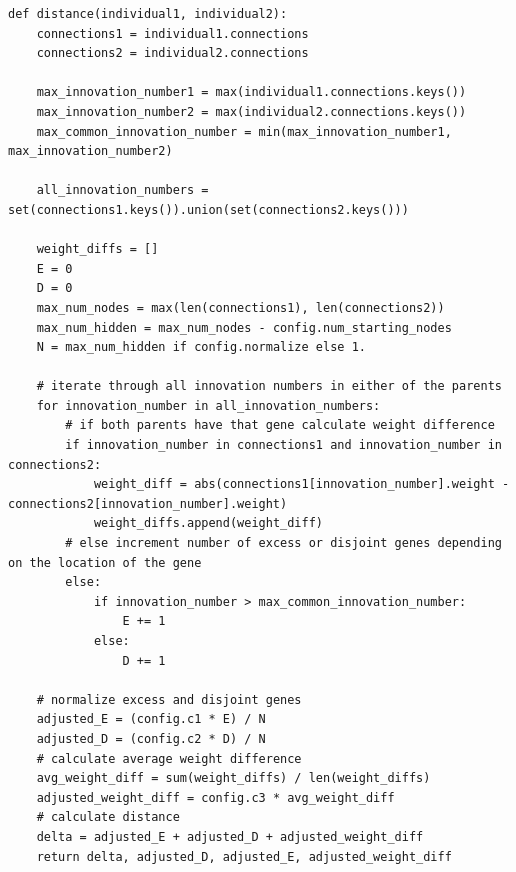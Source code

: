 \documentclass[times, utf8, diplomski, numeric]{fer}
\begin{document}
\begin{lstlisting}[frame=single, label=kod18, caption=Izvorni tekst metode \textit{distance} iz paketa \textit{utility}]
def distance(individual1, individual2):
	connections1 = individual1.connections
	connections2 = individual2.connections

	max_innovation_number1 = max(individual1.connections.keys())
	max_innovation_number2 = max(individual2.connections.keys())
	max_common_innovation_number = min(max_innovation_number1, max_innovation_number2)

	all_innovation_numbers = set(connections1.keys()).union(set(connections2.keys()))

	weight_diffs = []
	E = 0
	D = 0
	max_num_nodes = max(len(connections1), len(connections2))
	max_num_hidden = max_num_nodes - config.num_starting_nodes
	N = max_num_hidden if config.normalize else 1.

	# iterate through all innovation numbers in either of the parents
	for innovation_number in all_innovation_numbers:
		# if both parents have that gene calculate weight difference
		if innovation_number in connections1 and innovation_number in connections2:
			weight_diff = abs(connections1[innovation_number].weight - connections2[innovation_number].weight)
			weight_diffs.append(weight_diff)
		# else increment number of excess or disjoint genes depending on the location of the gene
		else:
			if innovation_number > max_common_innovation_number:
				E += 1
			else:
				D += 1

	# normalize excess and disjoint genes
	adjusted_E = (config.c1 * E) / N
	adjusted_D = (config.c2 * D) / N
	# calculate average weight difference
	avg_weight_diff = sum(weight_diffs) / len(weight_diffs)
	adjusted_weight_diff = config.c3 * avg_weight_diff
	# calculate distance
	delta = adjusted_E + adjusted_D + adjusted_weight_diff
	return delta, adjusted_D, adjusted_E, adjusted_weight_diff
\end{lstlisting}
\end{document}
